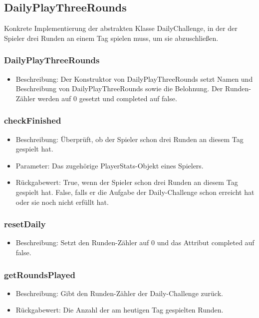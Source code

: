 \documentclass[a4paper]{scrreprt}
\begin{document}
    \subsection{DailyPlayThreeRounds}
    Konkrete Implementierung der abstrakten Klasse DailyChallenge, in der der Spieler drei Runden an einem Tag spielen muss, um sie abzuschließen.
    \subsubsection{DailyPlayThreeRounds}
    \begin{itemize}
        \item Beschreibung: Der Konstruktor von DailyPlayThreeRounds setzt Namen und Beschreibung von DailyPlayThreeRounds sowie die Belohnung. Der Runden-Zähler werden auf 0 gesetzt und completed auf false.
    \end{itemize}
    \subsubsection{checkFinished}
    \begin{itemize}
        \item Beschreibung: Überprüft, ob der Spieler schon drei Runden an diesem Tag gespielt hat.
        \item Parameter: Das zugehörige PlayerStats-Objekt eines Spielers.
        \item Rückgabewert: True, wenn der Spieler schon drei Runden an diesem Tag gespielt hat. False, falls er die Aufgabe der Daily-Challenge schon erreicht hat oder sie noch nicht erfüllt hat.
    \end{itemize}
    \subsubsection{resetDaily}
    \begin{itemize}
        \item Beschreibung: Setzt den Runden-Zähler auf 0 und das Attribut completed auf false.
    \end{itemize}
    \subsubsection{getRoundsPlayed}
    \begin{itemize}
        \item Beschreibung: Gibt den Runden-Zähler der Daily-Challenge zurück.
        \item Rückgabewert: Die Anzahl der am heutigen Tag gespielten Runden.
    \end{itemize}
\end{document}

